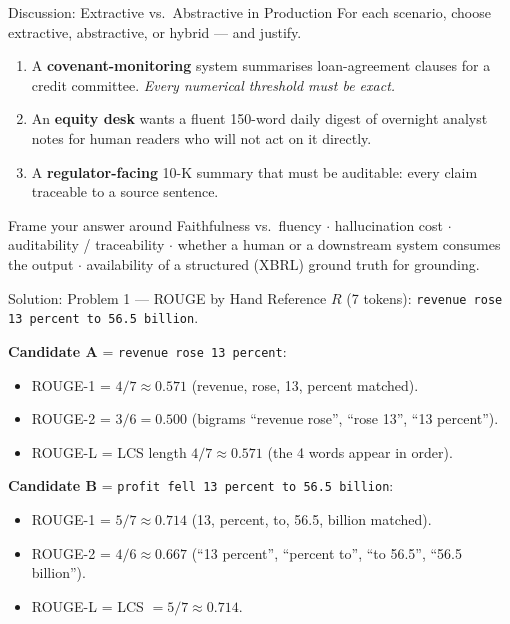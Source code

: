 \documentclass[9pt,t]{beamer}
\begin{document}
\begin{frame}{Discussion: Extractive vs.\ Abstractive in Production}
For each scenario, choose extractive, abstractive, or hybrid --- and justify.

\medskip
\begin{enumerate}
  \item A \textbf{covenant-monitoring} system summarises loan-agreement clauses for a
        credit committee. \emph{Every numerical threshold must be exact.}
  \item An \textbf{equity desk} wants a fluent 150-word daily digest of overnight
        analyst notes for human readers who will not act on it directly.
  \item A \textbf{regulator-facing} 10-K summary that must be auditable: every claim
        traceable to a source sentence.
\end{enumerate}

\medskip
\begin{block}{Frame your answer around}
Faithfulness vs.\ fluency $\cdot$ hallucination cost $\cdot$ auditability /
traceability $\cdot$ whether a human or a downstream system consumes the output
$\cdot$ availability of a structured (XBRL) ground truth for grounding.
\end{block}
\end{frame}

\begin{frame}{Solution: Problem 1 --- ROUGE by Hand}
Reference $R$ (7 tokens): \texttt{revenue rose 13 percent to 56.5 billion}.

\medskip
\textbf{Candidate A} = \texttt{revenue rose 13 percent}:
\begin{itemize}
  \item ROUGE-1 = $4/7 \approx \mathbf{0.571}$ (revenue, rose, 13, percent matched).
  \item ROUGE-2 = $3/6 = \mathbf{0.500}$ (bigrams ``revenue rose'', ``rose 13'', ``13 percent'').
  \item ROUGE-L = LCS length $4 / 7 \approx \mathbf{0.571}$ (the 4 words appear in order).
\end{itemize}

\medskip
\textbf{Candidate B} = \texttt{profit fell 13 percent to 56.5 billion}:
\begin{itemize}
  \item ROUGE-1 = $5/7 \approx \mathbf{0.714}$ (13, percent, to, 56.5, billion matched).
  \item ROUGE-2 = $4/6 \approx \mathbf{0.667}$ (``13 percent'', ``percent to'', ``to 56.5'', ``56.5 billion'').
  \item ROUGE-L = LCS $= 5/7 \approx \mathbf{0.714}$.
\end{itemize}
\end{frame}
\end{document}
